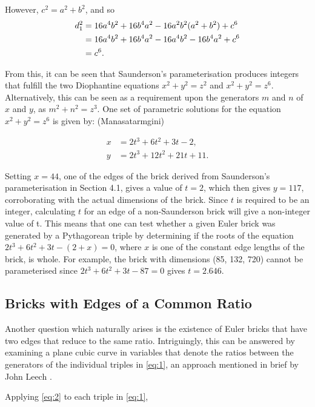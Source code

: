 \documentclass[11pt]{article}
\begin{document}
However, $c^2=a^2+b^2$, and so
\begin{equation}
\notag
\begin{aligned}
d_1^2&=16a^4b^2+16b^4a^2-16a^2b^2(a^2+b^2)+c^6\\
&=16a^4b^2+16b^4a^2-16a^4b^2-16b^4a^2+c^6\\
&=c^6.
\end{aligned}
\end{equation}

From this, it can be seen that Saunderson's parameterisation produces integers that fulfill the two Diophantine equations $x^2+y^2=z^2$ and $x^2+y^2=z^6$. Alternatively, this can be seen as a requirement upon the generators $m$ and $n$ of $x$ and $y$, as $m^2+n^2=z^3$. 
One set of parametric solutions for the equation $x^2+y^2=z^6$ is given by: (Manasatarmgini) \cite{mana}

\begin{equation*}
\begin{aligned}
x&=2t^3+6t^2+3t-2, \\
y&=2t^3+12t^2+21t+11.
\end{aligned}
\end{equation*}

Setting $x=44$, one of the edges of the brick derived from Saunderson's parameterisation in Section 4.1, gives a value of $t=2$, which then gives $y=117$, corroborating with the actual dimensions of the brick. Since $t$ is required to be an integer, calculating $t$ for an edge of a non-Saunderson brick will give a non-integer value of t. This means that one can test whether a given Euler brick was generated by a Pythagorean triple by determining if the roots of the equation $2t^3+6t^2+3t-(2+x)=0$, where $x$ is one of the constant edge lengths of the brick, is whole.
For example, the brick with dimensions (85, 132, 720) cannot be parameterised since $2t^3+6t^2+3t-87=0$ gives $t=2.646$.

\subsection{Bricks with Edges of a Common Ratio}
Another question which naturally arises is the existence of Euler bricks that have two edges that reduce to the same ratio.
Intriguingly, this can be answered by examining a plane cubic curve in variables that denote the ratios between the generators of the individual triples in \eqref{eq:1}, an approach mentioned in brief by John Leech \cite{leech}.

Applying \eqref{eq:2} to each triple in \eqref{eq:1},
\end{document}

